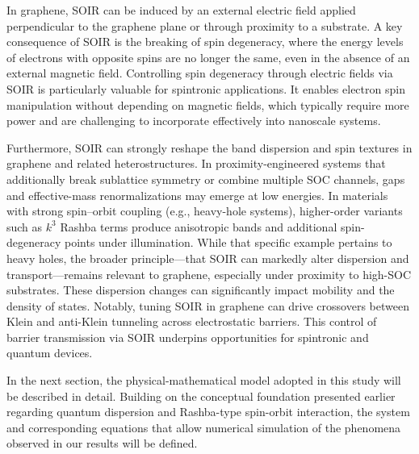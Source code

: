 In graphene, SOIR can be induced by an external electric field applied perpendicular to the graphene plane or through proximity to a substrate\cite{ShcherbakovSciAdv2021}.
A key consequence of SOIR is the breaking of spin degeneracy, where the energy levels of electrons with opposite spins are no longer the same, even in the absence of an external magnetic field\cite{DelkhoshPhysE2015}.
Controlling spin degeneracy through electric fields via SOIR is particularly valuable for spintronic applications.
It enables electron spin manipulation without depending on magnetic fields, which typically require more power and are challenging to incorporate effectively into nanoscale systems.


Furthermore, SOIR can strongly reshape the band dispersion and spin textures in graphene and related heterostructures\cite{WangPhysRevX2016}.
In proximity-engineered systems that additionally break sublattice symmetry or combine multiple SOC channels, gaps and effective-mass renormalizations may emerge at low energies\cite{WangPhysRevX2016, AvsarNatCommun2014}.
In materials with strong spin–orbit coupling (e.g., heavy-hole systems), higher-order variants such as $k^3$ Rashba terms produce anisotropic bands and additional spin-degeneracy points under illumination\cite{DellAnnaJPhysCondMatt2018, AvishaiPhysRevB2021}.
While that specific example pertains to heavy holes, the broader principle—that SOIR can markedly alter dispersion and transport—remains relevant to graphene, especially under proximity to high-SOC substrates\cite{GindikinPhysRevB2025}.
These dispersion changes can significantly impact mobility and the density of states.
Notably, tuning SOIR in graphene can drive crossovers between Klein and anti-Klein tunneling across electrostatic barriers\cite{DellAnnaJPhysCondMatt2018}.
This control of barrier transmission via SOIR underpins opportunities for spintronic and quantum devices\cite{YaoMater2024}.

In the next section, the physical-mathematical model adopted in this study will be described in detail.
Building on the conceptual foundation presented earlier regarding quantum dispersion and Rashba-type spin-orbit interaction, the system and corresponding equations that allow numerical simulation of the phenomena observed in our results will be defined.


